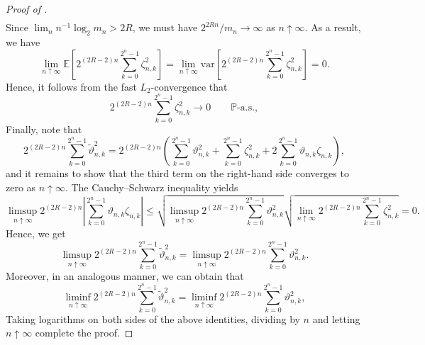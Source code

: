 \documentclass[12pt,reqno]{article}
\def\lra{\longrightarrow}
\def\ua{\uparrow}
\def\wt{\widetilde}
\numberwithin{equation}{section}
\def\var{\mbox{var}}
\theoremstyle{definition}
\def\lra{\longrightarrow}
\def\wt#1{\widetilde{#1}}
\def\lra{\longrightarrow}
\def\ua{\uparrow}
\def\wt{\widetilde}
\newcommand{\bE}{\mathbb{E}}
\newcommand{\bP}{\mathbb{P}}
\begin{document}
\begin{proof}[Proof of ]
\begin{equation*}
\begin{split}
		\end{split}
	\end{equation*}
	Since $\lim_n n^{-1}\log_2 m_n > 2R$, we must have $2^{2Rn}/m_n \rightarrow \infty$ as $n \ua \infty$. As a result, we have 
	\begin{equation*}
		\lim_{n \ua \infty} \bE\left[2^{(2R-2)n}\sum_{k = 0}^{2^n-1}\zeta^2_{n,k}\right] = \lim_{n \ua \infty} \var\left[2^{(2R-2)n}\sum_{k = 0}^{2^n-1}\zeta^2_{n,k}\right] = 0.
	\end{equation*}
	Hence, it follows from the fast $L_2$-convergence that
	\begin{equation*}
		2^{(2R-2)n}\sum_{k = 0}^{2^n-1}\zeta^2_{n,k} \lra 0 \qquad \bP\text{-a.s.},
	\end{equation*}
	Finally, note that 
	\begin{equation*}
		2^{(2R-2)n}\sum_{k = 0}^{2^n-1}\wt \vartheta^2_{n,k} = 2^{(2R-2)n}\left(\sum_{k = 0}^{2^n-1}\vartheta^2_{n,k} + \sum_{k = 0}^{2^n-1}\zeta^2_{n,k} + 2\sum_{k = 0}^{2^n-1}\vartheta_{n,k}\zeta_{n,k}\right),
	\end{equation*}
	and it remains to show that the third term on the right-hand side  converges to zero as $n \ua \infty$. The Cauchy--Schwarz inequality yields
	\begin{equation*}
		\limsup_{n \ua \infty}2^{(2R-2)n}\left|\sum_{k = 0}^{2^n-1}\vartheta_{n,k}\zeta_{n,k}\right| \le \sqrt{\limsup_{n \ua \infty}2^{(2R-2)n}\sum_{k = 0}^{2^n-1}\vartheta^2_{n,k}}\sqrt{\lim_{n \ua \infty}2^{(2R-2)n}\sum_{k = 0}^{2^n-1}\zeta^2_{n,k}} = 0.
	\end{equation*} 
	Hence, we get 
	\begin{equation*}
		\limsup_{n \ua \infty}2^{(2R-2)n}\sum_{k = 0}^{2^n-1}\wt \vartheta^2_{n,k} = \limsup_{n \ua \infty}2^{(2R-2)n}\sum_{k = 0}^{2^n-1} \vartheta^2_{n,k}.
	\end{equation*}
	Moreover, in an analogous manner, we can obtain that 
	\begin{equation*}
		\liminf_{n \ua \infty}2^{(2R-2)n}\sum_{k = 0}^{2^n-1}\wt \vartheta^2_{n,k} = \liminf_{n \ua \infty}2^{(2R-2)n}\sum_{k = 0}^{2^n-1} \vartheta^2_{n,k},
	\end{equation*}
	Taking logarithms on both sides of the above identities, dividing by $n$ and letting $n \ua \infty$ complete the proof.
\end{proof}
\end{document}
